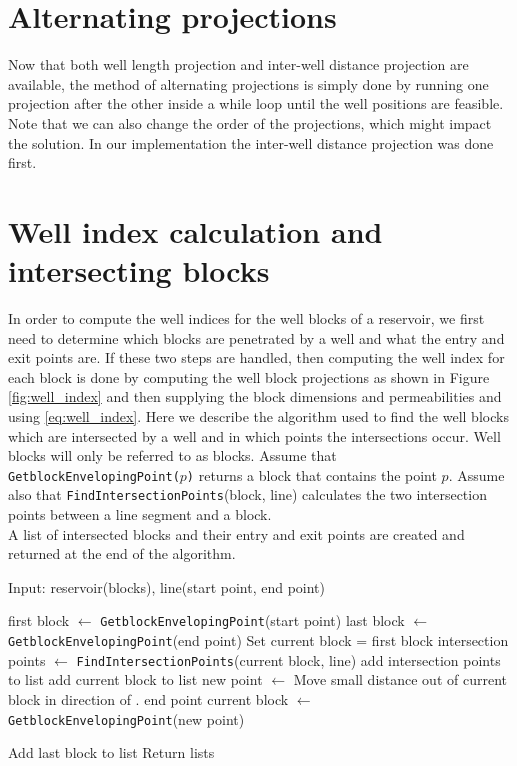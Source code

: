 \section{Alternating projections}
%
Now that both well length projection and inter-well distance
projection are available, the method of alternating projections
is simply done by running one projection after the other inside
a while loop until the well positions are feasible. Note that
we can also change the order of the projections, which might
impact the solution. In our implementation the inter-well
distance projection was done first.
%
\section{Well index calculation and intersecting blocks}
%
In order to compute the well indices for the well blocks
of a reservoir, we first need to determine which blocks
are penetrated by a well and what the entry and exit points
are. If these two steps are handled, then computing the well
index for each block is done by computing the well block
projections as shown in Figure \ref{fig:well_index} and then
supplying the block dimensions and permeabilities and using
\eqref{eq:well_index}. Here we describe the algorithm
used to find the well blocks which are intersected by a well
and in which points the intersections occur. Well blocks will
only be referred to as blocks.
%
Assume that \texttt{GetblockEnvelopingPoint($p$)} returns a block 
that contains the point $p$. Assume also that \texttt{FindIntersectionPoints}(block, line)
calculates the two intersection points 
between a line segment and a block.\\
%
A list of intersected blocks and their entry and exit points are created
and returned at the end of the algorithm.
%
\begin{algorithm}
\caption{Input: reservoir(blocks), line(start point, end point) }\label{alg:block_intersection}
\begin{algorithmic}[1]
\State first block $\gets$ \texttt{GetblockEnvelopingPoint}(start point)
\State last block $\gets$ \texttt{GetblockEnvelopingPoint}(end point)
\State Set current block = first block
\State 
{}
	\State intersection points $\gets$ \texttt{FindIntersectionPoints}(current block, line)
	\State add intersection points to list
	\State add current block to list
	\State
	\State new point $\gets$ Move small distance out of current block in direction of \hspace{10mm} .\hspace{10mm} end point
	\State 
	\State current block $\gets$ \texttt{GetblockEnvelopingPoint}(new point)
	\State 
\EndWhile

\State Add last block to list
\State Return lists

\EndProcedure
\end{algorithmic}
\end{algorithm}
